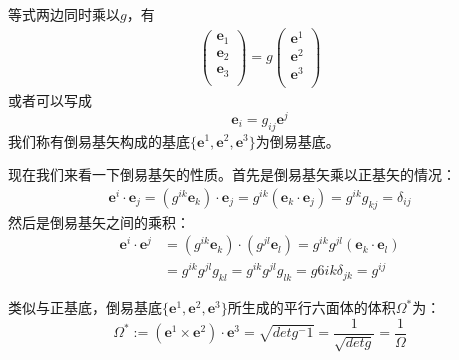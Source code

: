 等式两边同时乘以$g$，有
\begin{equation}
    \begin{aligned}
     \left(
    \begin{array}{c}
         \boldsymbol{e}_1  \\
         \boldsymbol{e}_2  \\
         \boldsymbol{e}_3  \\
    \end{array}\right) = g\left(
    \begin{array}{c}
         \boldsymbol{e}^1  \\
         \boldsymbol{e}^2  \\
         \boldsymbol{e}^3  \\
    \end{array}\right) 
    \end{aligned}
\end{equation}
或者可以写成
\begin{equation}
    \boldsymbol{e}_i = g_{ij} \boldsymbol{e}^j
\end{equation}
我们称有倒易基矢构成的基底$\{\boldsymbol{e}^1,\boldsymbol{e}^2,\boldsymbol{e}^3\}$为倒易基底。
\par 现在我们来看一下倒易基矢的性质。首先是倒易基矢乘以正基矢的情况：
\begin{equation}
    \begin{aligned}
        \boldsymbol{e}^i \cdot \boldsymbol{e}_j = (g^{ik}\boldsymbol{e}_k)\cdot \boldsymbol{e}_j = g^{ik} (\boldsymbol{e}_k \cdot \boldsymbol{e}_j) = g^{ik}g_{kj} = \delta_{ij}
    \end{aligned}
\end{equation}
然后是倒易基矢之间的乘积：
\begin{equation}
\begin{aligned}
    \boldsymbol{e}^i\cdot \boldsymbol{e}^j &= (g^{ik}\boldsymbol{e}_k)\cdot (g^{jl}\boldsymbol{e}_l) = g^{ik}g^{jl}(\boldsymbol{e}_k \cdot \boldsymbol{e}_l) \\
    &= g^{ik}g^{jl}g_{kl} = g^{ik}g^{jl}g_{lk} =g6{ik}\delta_{jk} =g^{ij}
\end{aligned}
\end{equation}
\par 类似与正基底，倒易基底$\{\boldsymbol{e}^1,\boldsymbol{e}^2,\boldsymbol{e}^3\}$所生成的平行六面体的体积$\Omega^*$为：
\begin{equation}
    \Omega^* := (\boldsymbol{e}^1 \times \boldsymbol{e}^2)\cdot \boldsymbol{e}^3 = \sqrt{detg^-1} = \frac{1}{\sqrt{det g}} = \frac{1}{\Omega}
\end{equation}
